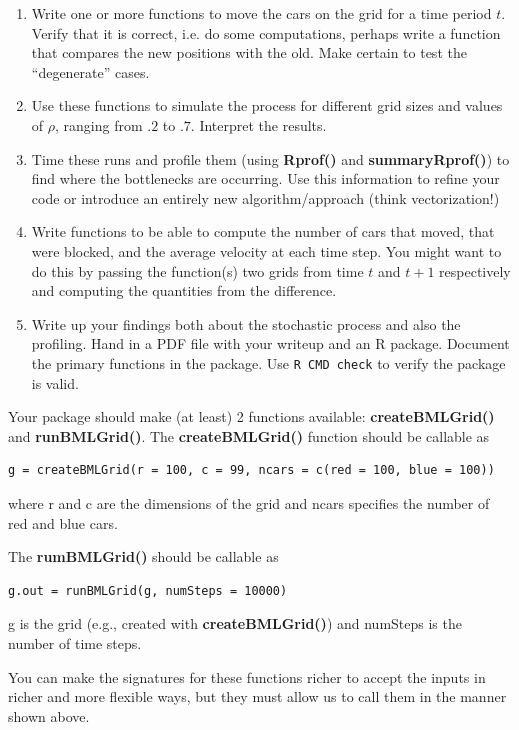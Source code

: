\documentclass{article}
\def\Rfunc#1{\textbf{#1()}}
\begin{document}
\begin{enumerate}
 \item Write one or more functions to move the cars on the grid
 for a time period $t$.
 Verify that it is correct, i.e. do some computations, perhaps write a
 function that compares the new positions with the old.  Make certain
 to test the ``degenerate'' cases.
 

\item Use these functions to simulate the process for different grid sizes
  and values of $\rho$, ranging from $.2$ to $.7$.
  Interpret the results.

\item Time these runs and profile them (using \Rfunc{Rprof} and
  \Rfunc{summaryRprof}) to find where the bottlenecks are occurring.
  Use this information to refine your code or introduce an entirely
  new algorithm/approach (think vectorization!)

 \item Write functions to be able to compute 
   the number of cars that moved, that were blocked,
   and the average velocity at each time step.
   You might want to do this by passing the function(s)
   two grids from time $t$ and $t+1$ respectively and computing
   the quantities from the difference.


 \item Write up your findings both about the stochastic process 
       and also the profiling.  Hand in a PDF file with your writeup
       and an R package.
       Document the primary functions in the package.
       Use \verb+R CMD check+ to verify the package is valid.
   
\end{enumerate}


Your package should make (at least) 2 functions available:
\Rfunc{createBMLGrid} and \Rfunc{runBMLGrid}.
The \Rfunc{createBMLGrid} function should be callable
as
\begin{verbatim}
g = createBMLGrid(r = 100, c = 99, ncars = c(red = 100, blue = 100))
\end{verbatim}
where r and c are the dimensions of the grid and ncars specifies
the number of red and blue cars.

The \Rfunc{rumBMLGrid} should be callable as
\begin{verbatim}
g.out = runBMLGrid(g, numSteps = 10000)
\end{verbatim}
g is the grid (e.g., created with \Rfunc{createBMLGrid})
and numSteps is the number of time steps.

You can make the signatures for these functions richer to accept 
the inputs in richer and more flexible ways, but they must allow
us to call them in the manner shown above.
\end{document}
